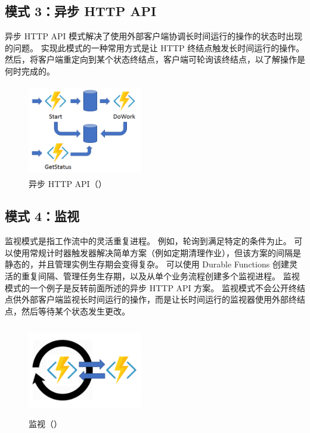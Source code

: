 \documentclass[11pt]{article}
\begin{document}
\subsection{模式 3：异步 HTTP API
}
异步 HTTP API 模式解决了使用外部客户端协调长时间运行的操作的状态时出现的问题。 实现此模式的一种常用方式是让 HTTP 终结点触发长时间运行的操作。 然后，将客户端重定向到某个状态终结点，客户端可轮询该终结点，以了解操作是何时完成的。
\begin{figure}[H]
\begin{flushleft}
\includegraphics[width=5cm, height=4cm]{figs/model3}
\caption{异步 HTTP API（\cite{Durable}）}
\end{flushleft}
\end{figure}

\subsection{模式 4：监视}
监视模式是指工作流中的灵活重复进程。 例如，轮询到满足特定的条件为止。 可以使用常规计时器触发器解决简单方案（例如定期清理作业），但该方案的间隔是静态的，并且管理实例生存期会变得复杂。 可以使用 Durable Functions 创建灵活的重复间隔、管理任务生存期，以及从单个业务流程创建多个监视进程。
监视模式的一个例子是反转前面所述的异步 HTTP API 方案。 监视模式不会公开终结点供外部客户端监视长时间运行的操作，而是让长时间运行的监视器使用外部终结点，然后等待某个状态发生更改。
\begin{figure}[H]
\begin{flushleft}
\includegraphics[width=5cm, height=4cm]{figs/model4}
\caption{监视（\cite{Durable}）}
\end{flushleft}
\end{figure}
\end{document}
